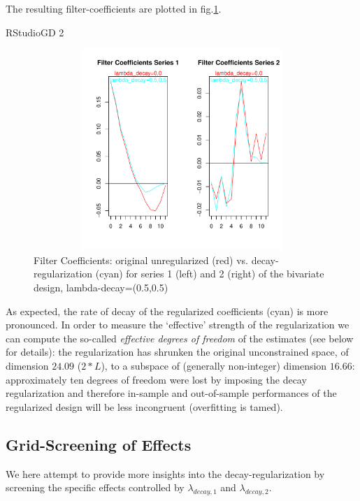 \documentclass[a4paper]{book}
\begin{document}
The resulting filter-coefficients are plotted in fig.\ref{z_mdfa_ms_reg_decay}.
\begin{Schunk}
\begin{Soutput}
RStudioGD 
        2 
\end{Soutput}
\end{Schunk}
\begin{figure}[H]\begin{center}\includegraphics[height=3in, width=6in]{z_mdfa_ms_reg_decay}\caption{Filter Coefficients: original unregularized (red) vs. decay-regularization (cyan) for series 1 (left) and 2 (right) of the bivariate design, lambda-decay=(0.5,0.5)\label{z_mdfa_ms_reg_decay}}\end{center}\end{figure}As expected, the rate of decay of the regularized coefficients (cyan) is more pronounced. In order to measure the `effective' strength of the regularization we can compute the so-called \emph{effective degrees of freedom} of the estimates (see below for details): the regularization has shrunken the original unconstrained space, of dimension $24.09$ ($2*L$), to a subspace of (generally non-integer) dimension $16.66$: approximately ten degrees of freedom were lost by imposing the decay regularization and therefore in-sample and out-of-sample performances of the regularized design will be less incongruent (overfitting is tamed).



\subsection{Grid-Screening of Effects}

We here attempt to provide more insights into the decay-regularization by screening the specific effects controlled by $\lambda_{decay,1}$ and $\lambda_{decay,2}$.
\end{document}
